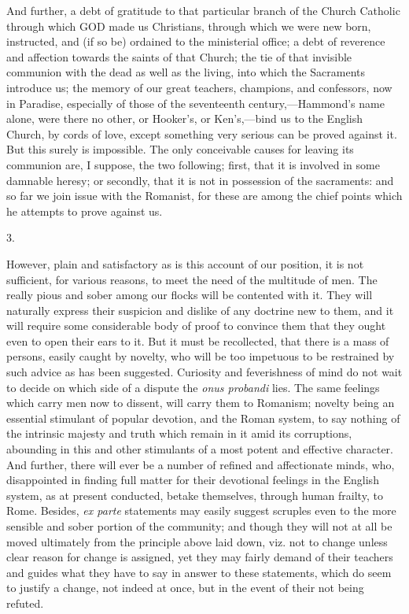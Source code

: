 And further, a debt of gratitude to that
particular branch of the Church Catholic through which GOD
made us Christians, through which we were new born, instructed, and
(if so be) ordained to the ministerial office; a debt of reverence and
affection towards the saints of that Church; the tie of that invisible
communion with the dead as well as the living, into which the
Sacraments introduce us; the memory of our great teachers, champions,
and confessors, now in Paradise, especially of those of the
seventeenth century,—Hammond's name alone, were there no other, or
Hooker's, or Ken's,—bind us to the English Church, by cords of love,
except something very serious can be proved against it. But this
surely is impossible. The only conceivable causes for leaving its
communion are, I suppose, the two following; first, that it is
involved in some damnable heresy; or secondly, that it is not in
possession of the sacraments: and so far we join issue with the
Romanist, for these are among the chief points which he attempts to
prove against us.

3.

However, plain and satisfactory as is this
account of our position, it is not sufficient, for various reasons, to
meet the need of the multitude of men. The really pious and sober
among our flocks will be contented with it. They will naturally
express their suspicion and dislike of any doctrine new to them, and
it will require some considerable body of proof to convince them that
they ought even to open their ears to it. But it must be recollected,
that there is a mass of persons, easily caught by novelty, who will be
too impetuous to be restrained by such advice as has been suggested.
Curiosity and feverishness of mind do not wait to decide on which side
of a dispute the \emph{onus probandi} lies. The same feelings which
carry men now to dissent, will carry them to Romanism; novelty being
an essential stimulant of popular devotion, and the Roman system, to
say nothing of the intrinsic majesty and truth which remain in it amid
its corruptions, abounding in this and other stimulants of a most
potent and effective character. And further, there will ever be a
number of refined and affectionate minds, who, disappointed in finding
full matter for their devotional feelings in the English system, as at
present conducted, betake themselves, through human frailty, to Rome.
Besides, \emph{ex parte} statements may easily suggest scruples even
to the more sensible and sober portion of the community; and though
they will not at all be moved ultimately from the principle above laid
down, viz. not to change unless clear reason for change is assigned,
yet they may fairly demand of their teachers and guides what they have
to say in answer to these statements, which do seem to justify a
change, not indeed at once, but in the event of their not being
refuted.

